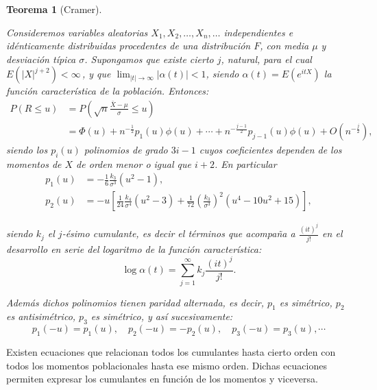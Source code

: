 \documentclass[
]{book}
\theoremstyle{break}
\newtheorem{theorem}{Teorema}[chapter]
\theoremstyle{nonumberplain}
\begin{document}
\begin{theorem}[Cramer]
\protect\hypertarget{thm:aprox-cramer}{}\label{thm:aprox-cramer} \vspace{0.5cm}

Consideremos variables aleatorias
\(X_1,X_2,\ldots ,X_n,\ldots\) independientes e idénticamente
distribuidas procedentes de una distribución \(F\), con media \(\mu\) y
desviación típica \(\sigma\). Supongamos que existe cierto \(j\), natural,
para el cual \(E\left( \left\vert X\right\vert^{j+2} \right) <\infty
\,\), y que \(\lim_{\left\vert t\right\vert \rightarrow \infty }\left\vert
\alpha \left( t \right) \right\vert <1\), siendo \(\alpha \left( t \right)
=E\left( e^{itX} \right)\) la función característica de la población.
Entonces:
\[\begin{aligned}
P\left( R\leq u \right) &=P\left( \sqrt{n}\frac{\bar{X}-\mu }{\sigma }
\leq u \right) \\
&= \Phi \left( u \right) +n^{-\frac{1}{2}}p_1\left( u \right) \phi \left(
u \right) +\cdots +n^{-\frac{j-1}{2}}p_{j-1}\left( u \right) \phi \left(
u \right) +O\left( n^{-\frac{j}{2}} \right),
\end{aligned}\]
siendo los \(p_i\left( u \right)\) polinomios de grado \(3i-1\) cuyos coeficientes
dependen de los momentos de \(X\) de orden menor o igual que \(i+2\).
En particular
\[\begin{aligned}
p_1\left( u \right) &= -\frac{1}{6}\frac{k_3}{\sigma^{3}}\left(
u^2-1 \right), \\
p_2\left( u \right) &= -u\left[ \frac{1}{24}\frac{k_4}{\sigma^{4}}\left(
u^2-3 \right) +\frac{1}{72}\left( \frac{k_3}{\sigma^{3}} \right)
^2\left( u^{4}-10u^2+15 \right) \right] ,
\end{aligned}\]

siendo \(k_j\) el \(j\)-ésimo cumulante, es decir el términos que acompaña
a \(\frac{\left( it \right)^{j}}{j!}\) en el desarrollo en serie del
logaritmo de la función característica:
\[\log \alpha \left( t \right) =\sum_{j=1}^{\infty }k_j\frac{\left( it \right)
^{j}}{j!}.\]

Además dichos polinomios tienen paridad alternada, es
decir, \(p_1\) es simétrico, \(p_2\) es antisimétrico, \(p_3\) es
simétrico, y así sucesivamente:
\[p_1\left( -u \right) = p_1\left( u \right),\quad p_2\left( -u \right)
= -p_2\left( u \right),\quad p_3\left( -u \right) = p_3\left( u \right)
,\cdots\]
\end{theorem}

Existen ecuaciones que relacionan todos los cumulantes hasta cierto
orden con todos los momentos poblacionales hasta ese mismo orden. Dichas
ecuaciones permiten expresar los cumulantes en función de los momentos y
viceversa.
\end{document}
